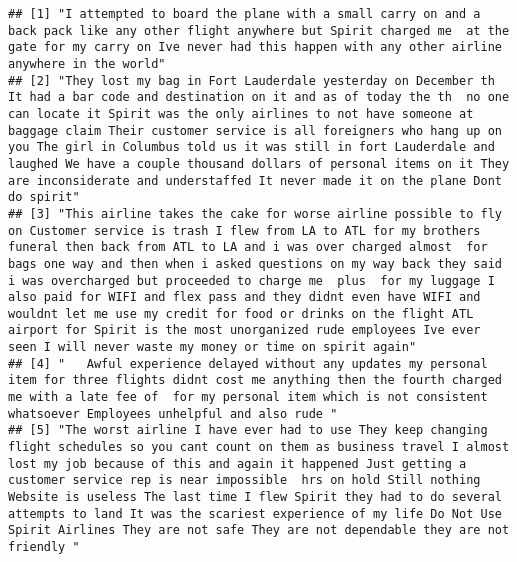 \documentclass[
]{article}
\begin{document}
\begin{verbatim}
## [1] "I attempted to board the plane with a small carry on and a back pack like any other flight anywhere but Spirit charged me  at the gate for my carry on Ive never had this happen with any other airline anywhere in the world"                                                                                                                                                                                                                                                                                                                                                                                    
## [2] "They lost my bag in Fort Lauderdale yesterday on December th It had a bar code and destination on it and as of today the th  no one can locate it Spirit was the only airlines to not have someone at baggage claim Their customer service is all foreigners who hang up on you The girl in Columbus told us it was still in fort Lauderdale and laughed We have a couple thousand dollars of personal items on it They are inconsiderate and understaffed It never made it on the plane Dont do spirit"                                                                                                          
## [3] "This airline takes the cake for worse airline possible to fly on Customer service is trash I flew from LA to ATL for my brothers funeral then back from ATL to LA and i was over charged almost  for  bags one way and then when i asked questions on my way back they said i was overcharged but proceeded to charge me  plus  for my luggage I also paid for WIFI and flex pass and they didnt even have WIFI and wouldnt let me use my credit for food or drinks on the flight ATL airport for Spirit is the most unorganized rude employees Ive ever seen I will never waste my money or time on spirit again"
## [4] "   Awful experience delayed without any updates my personal item for three flights didnt cost me anything then the fourth charged me with a late fee of  for my personal item which is not consistent whatsoever Employees unhelpful and also rude "                                                                                                                                                                                                                                                                                                                                                              
## [5] "The worst airline I have ever had to use They keep changing flight schedules so you cant count on them as business travel I almost lost my job because of this and again it happened Just getting a customer service rep is near impossible  hrs on hold Still nothing Website is useless The last time I flew Spirit they had to do several attempts to land It was the scariest experience of my life Do Not Use Spirit Airlines They are not safe They are not dependable they are not friendly "
\end{verbatim}
\end{document}
